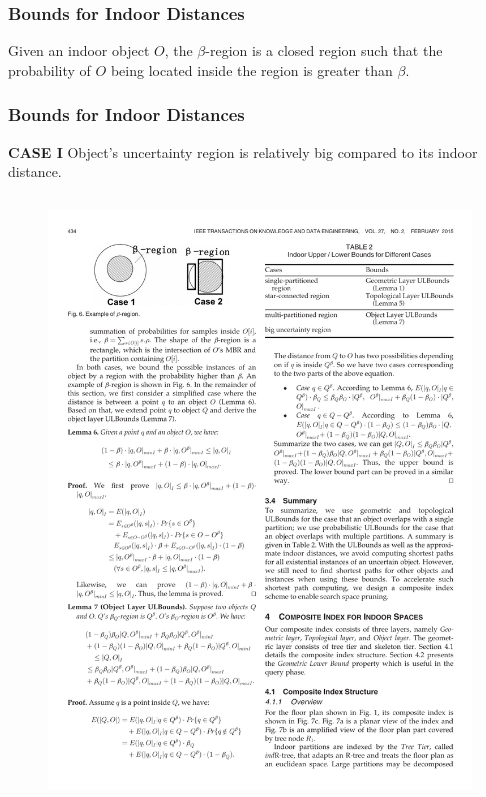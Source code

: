 
\begin{frame}
\frametitle{Bounds for Indoor Distances}

\begin{definition}
  Given an indoor object $O$, the $\beta$-region is a closed region such that the probability of $O$ being located inside the region is greater than $\beta$.
\end{definition}

\end{frame}


\begin{frame}
\frametitle{Bounds for Indoor Distances}

\textbf{CASE I} \quad Object's uncertainty region is relatively big compared to its indoor distance.

\vspace{30pt}

\begin{columns}[c]

  \begin{figure}[tb]
    \includegraphics[width=\columnwidth]{figures/2-7/2-7-4.pdf}
  \end{figure}


\end{columns}
\end{frame}
